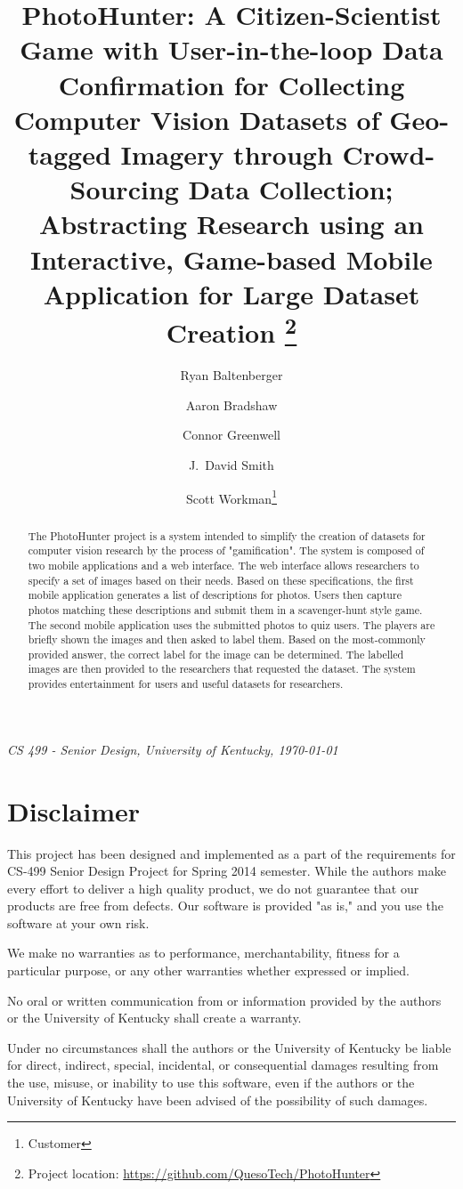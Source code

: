 \documentclass{article}
\title{PhotoHunter: A Citizen-Scientist Game with User-in-the-loop
  Data Confirmation for Collecting Computer Vision Datasets of
  Geo-tagged Imagery through Crowd-Sourcing Data Collection; Abstracting
  Research using an Interactive, Game-based Mobile Application for Large
  Dataset Creation
  \footnote{Project location:
    \url{https://github.com/QuesoTech/PhotoHunter}
  }
}
\author{
	Ryan Baltenberger \and 
	Aaron Bradshaw \and 
	Connor Greenwell \and 
	J.\ David Smith \and 
	Scott Workman\footnote{Customer}
}
\date{}
\begin{document}
\maketitle

\begin{center}
  \textit{CS 499 - Senior Design, University of Kentucky, \today}
\end{center}

\begin{abstract}
  The PhotoHunter project is a system intended to simplify the creation of
  datasets for computer vision research by the process of "gamification". The
  system is composed of two mobile applications and a web interface. The web
  interface allows researchers to specify a set of images based on their needs.
  Based on these specifications, the first mobile application generates a list of
  descriptions for photos. Users then capture photos matching these descriptions
  and submit them in a scavenger-hunt style game. The second mobile application
  uses the submitted photos to quiz users. The players are briefly shown the
  images and then asked to label them. Based on the most-commonly provided
  answer, the correct label for the image can be determined. The labelled images
  are then provided to the researchers that requested the dataset. The system
  provides entertainment for users and useful datasets for researchers.
\end{abstract}

\section{Disclaimer}
This project has been designed and implemented as a part of the requirements
for CS-499 Senior Design Project for Spring 2014 semester.  While the authors
make every effort to deliver a high quality product, we do not guarantee that
our products are free from defects.  Our software is provided "as is," and you
use the software at your own risk.

We make no warranties as to performance, merchantability, fitness for a
particular purpose, or any other warranties whether expressed or implied.

No oral or written communication from or information provided by the authors or
the University of Kentucky shall create a warranty.

Under no circumstances shall the authors or the University of Kentucky be
liable for direct, indirect, special, incidental, or consequential damages
resulting from the use, misuse, or inability to use this software, even if the
authors or the University of Kentucky have been advised of the possibility of
such damages.
\end{document}
